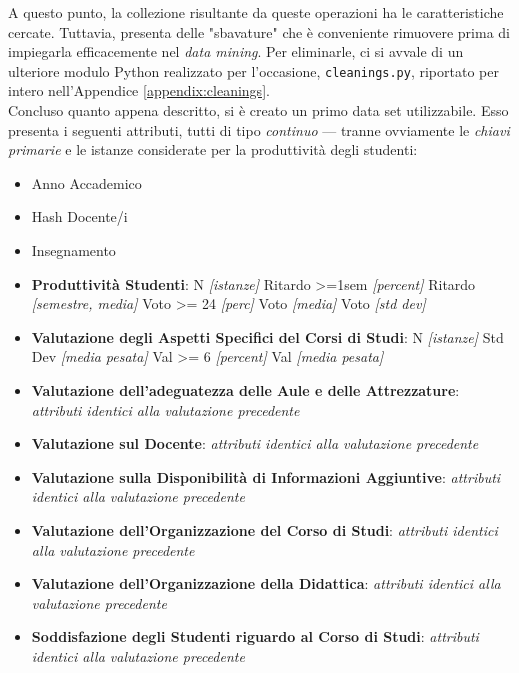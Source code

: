 		A questo punto, la collezione risultante da queste operazioni ha le caratteristiche cercate. Tuttavia, presenta delle "sbavature" che è conveniente rimuovere prima di impiegarla efficacemente nel \textit{data mining}. Per eliminarle, ci si avvale di un ulteriore modulo Python realizzato per l'occasione, \texttt{cleanings.py}, riportato per intero nell'Appendice \ref{appendix:cleanings}. \\

		Concluso quanto appena descritto, si è creato un primo data set utilizzabile. Esso presenta i seguenti attributi, tutti di tipo	\textit{continuo} --- tranne ovviamente le \textit{chiavi primarie} e le istanze considerate per la produttività degli studenti:

		\begin{itemize}
			\item Anno Accademico
			\item Hash Docente/i
			\item Insegnamento
			\item \textbf{Produttività Studenti}:
				\subitem N \textit{[istanze]}
				\subitem Ritardo >=1sem \textit{[percent]}
				\subitem Ritardo \textit{[semestre, media]}
				\subitem Voto >= 24 \textit{[perc]}
				\subitem Voto \textit{[media]}
				\subitem Voto \textit{[std dev]}
			\item \textbf{Valutazione degli Aspetti Specifici del Corsi di Studi}:
				\subitem N \textit{[istanze]}
				\subitem Std Dev \textit{[media pesata]}
				\subitem Val >= 6 \textit{[percent]}
				\subitem Val \textit{[media pesata]}
			\item \textbf{Valutazione dell'adeguatezza delle Aule e delle Attrezzature}:
				\subitem \textit{attributi identici alla valutazione precedente}
			\item \textbf{Valutazione sul Docente}:
				\subitem \textit{attributi identici alla valutazione precedente}
			\item \textbf{Valutazione sulla Disponibilità di Informazioni Aggiuntive}:
				\subitem \textit{attributi identici alla valutazione precedente}
			\item \textbf{Valutazione dell'Organizzazione del Corso di Studi}:
				\subitem \textit{attributi identici alla valutazione precedente}
			\item \textbf{Valutazione dell'Organizzazione della Didattica}:
				\subitem \textit{attributi identici alla valutazione precedente}
			\item \textbf{Soddisfazione degli Studenti riguardo al Corso di Studi}:
				\subitem \textit{attributi identici alla valutazione precedente}
		\end{itemize}

